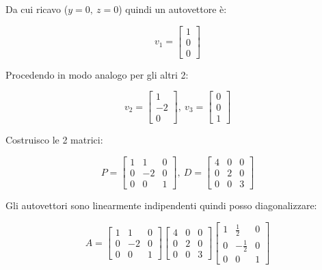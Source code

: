 \documentclass{article}
\begin{document}
\vspace{5pt}

Da cui ricavo ($y=0,\ z=0$) quindi un autovettore è:

\[
v_1=
\begin{bmatrix}
1\\0\\0
\end{bmatrix}
\]

\vspace{5pt}

Procedendo in modo analogo per gli altri 2:

\[
v_2=
\begin{bmatrix}
1\\-2\\0
\end{bmatrix},\
v_3=
\begin{bmatrix}
0\\0\\1
\end{bmatrix}
\]

\vspace{5pt}

Costruisco le 2 matrici:

\[
P=
\begin{bmatrix}
1 & 1 & 0\\
0 & -2 & 0\\
0 & 0 & 1
\end{bmatrix},\
D=
\begin{bmatrix}
4 & 0 & 0\\
0 & 2 & 0\\
0 & 0 & 3
\end{bmatrix}
\]

\vspace{5pt}

Gli autovettori sono linearmente indipendenti quindi posso diagonalizzare:

\[
    A=
    \begin{bmatrix}
        1 & 1 & 0\\
        0 & -2 & 0\\
        0 & 0 & 1
    \end{bmatrix}
    \begin{bmatrix}
        4 & 0 & 0\\
        0 & 2 & 0\\
        0 & 0 & 3
    \end{bmatrix}
    \begin{bmatrix}
        1 & \frac{1}{2} & 0\\
        0 & -\frac{1}{2} & 0\\
        0 & 0 & 1
    \end{bmatrix}
\]
\end{document}
